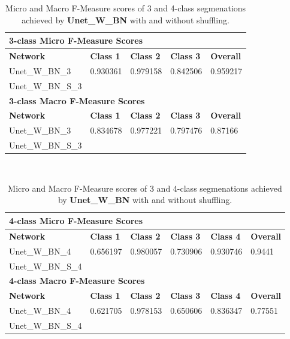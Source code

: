 \begin {table}
	\begin{flushleft}
		\begin {tabular}[!ht]{|l|l|l|l|l|}
			\hline\multicolumn{5}{|l|}{\textbf{3-class Micro F-Measure Scores}} \\ \hline
			\textbf{Network}& \textbf{Class 1}& \textbf{Class 2}& \textbf{Class 3}& \textbf{Overall} \\ \hline
			Unet\_W\_BN\_3& 0.930361&  0.979158& 0.842506& 0.959217\\ \hline
			Unet\_W\_BN\_S\_3& &  & & \\ \hline
			\multicolumn{5}{|l|}{\textbf{3-class Macro F-Measure Scores}} \\ \hline
			\textbf{Network}& \textbf{Class 1}& \textbf{Class 2}& \textbf{Class 3}& \textbf{Overall} \\ \hline
			Unet\_W\_BN\_3& 0.834678& 0.977221& 0.797476& 0.87166\\ \hline
			Unet\_W\_BN\_S\_3& & & & \\ \hline
		\end {tabular}
		\vspace{0.5cm}\\
		\begin {tabular}[!ht]{|l|l|l|l|l|l|}
			\hline\multicolumn{6}{|l|}{\textbf{4-class Micro F-Measure Scores}} \\ \hline
			\textbf{Network}& \textbf{Class 1}& \textbf{Class 2}& \textbf{Class 3}& \textbf{Class 4}& \textbf{Overall} \\ \hline
			Unet\_W\_BN\_4& 0.656197& 0.980057& 0.730906& 0.930746& 0.9441\\ \hline
			Unet\_W\_BN\_S\_4& & & & & \\ \hline
			\multicolumn{6}{|l|}{\textbf{4-class Macro F-Measure Scores}} \\ \hline
			\textbf{Network}& \textbf{Class 1}& \textbf{Class 2}& \textbf{Class 3}& \textbf{Class 4}& \textbf{Overall} \\ \hline
			Unet\_W\_BN\_4& 0.621705& 0.978153& 0.650606& 0.836347& 0.77551\\ \hline
			Unet\_W\_BN\_S\_4& & & & & \\ \hline
		\end {tabular}
	\end {flushleft}

\caption[Micro and Macro F-Measure scores for a network with Batch Normalization and with or without shuffling.]{Micro and Macro F-Measure scores of 3 and 4-class segmenations achieved by \textbf{Unet\_W\_BN} with and without shuffling.}
\label{tab:results3}
\end {table}


